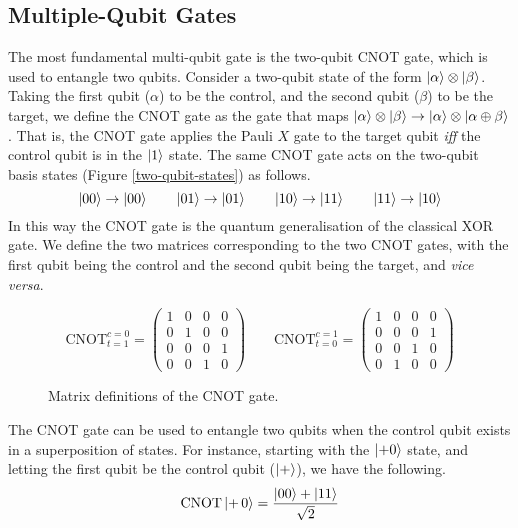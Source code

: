 \subsection{Multiple-Qubit Gates}

The most fundamental multi-qubit gate is the two-qubit CNOT gate, which is used to entangle two qubits. Consider a two-qubit state of the form $\ket \alpha \otimes \ket \beta$. Taking the first qubit ($\alpha$) to be the control, and the second qubit ($\beta$) to be the target, we define the CNOT gate as the gate that maps $\ket\alpha\otimes\ket\beta \rightarrow \ket\alpha\otimes\ket{\alpha\oplus\beta}$. That is, the CNOT gate applies the Pauli $X$ gate to the target qubit \textit{iff} the control qubit is in the $\ket 1$ state. The same CNOT gate acts on the two-qubit basis states (Figure \ref{two-qubit-states}) as follows.
\begin{equation*}
    \ket{00} \rightarrow \ket {00} \qquad
    \ket{01} \rightarrow \ket {01} \qquad
    \ket{10} \rightarrow \ket {11} \qquad
    \ket{11} \rightarrow \ket {10}
\end{equation*}
In this way the CNOT gate is the quantum generalisation of the classical XOR gate. We define the two matrices corresponding to the two CNOT gates, with the first qubit being the control and the second qubit being the target, and \textit{vice versa}.

\begin{figure}[H]
    \centering
    \begin{equation*}
    \text{CNOT}^{c=0}_{t=1} =
        \begin{pmatrix}
            1 & 0 & 0 & 0 \\
            0 & 1 & 0 & 0 \\
            0 & 0 & 0 & 1 \\
            0 & 0 & 1 & 0
        \end{pmatrix} \qquad
        \text{CNOT}^{c=1}_{t=0} =
        \begin{pmatrix}
            1 & 0 & 0 & 0 \\
            0 & 0 & 0 & 1 \\
            0 & 0 & 1 & 0 \\
            0 & 1 & 0 & 0
        \end{pmatrix}
    \end{equation*}
    \caption{Matrix definitions of the CNOT gate.}
    \label{cnot-definition}
\end{figure}

The CNOT gate can be used to entangle two qubits when the control qubit exists in a superposition of states. For instance, starting with the $\ket{+0}$ state, and letting the first qubit be the control qubit ($\ket +$), we have the following.
\smallskip
\begin{equation*}
    \text{CNOT} \ket{+ \, 0} = \frac{\ket{00} + \ket{11}}{\sqrt 2}
\end{equation*}


